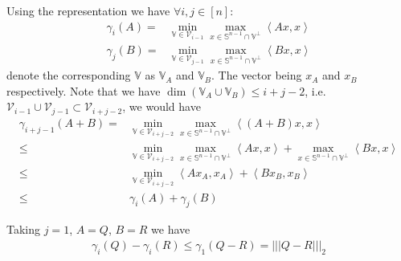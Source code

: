 \documentclass[11pt,a4paper]{ctexart}
\numberwithin{equation}{section}%
\begin{document}
Using the representation we have $ \forall i,j\in[n] $:
\begin{align*}
    \gamma _i(A) = & \mathop{ \min }\limits_{\mathbb{V}\in\mathcal{V}_{i-1}}  \mathop{ \max  }\limits_{x\in \mathbb{S}^{n-1} \cap \mathbb{V}^\perp} \left\langle Ax,x \right\rangle  \\
    \gamma _j(B) = & \mathop{ \min }\limits_{\mathbb{V}\in\mathcal{V}_{j-1}}  \mathop{ \max  }\limits_{x\in \mathbb{S}^{n-1} \cap \mathbb{V}^\perp} \left\langle Bx,x \right\rangle
\end{align*}
denote the corresponding $ \mathbb{V} $ as $ \mathbb{V}_A $ and $ \mathbb{V}_B $. The vector being $ x_A $ and $ x_B $ respectively.
Note that we have $ \dim ( \mathbb{V}_A\cup \mathbb{V}_B)\leq i+j-2 $, i.e. $ \mathcal{V}_{i-1}\cup \mathcal{V}_{j-1}\subset \mathcal{V}_{i+j-2} $, we would have
\begin{align*}
    \gamma _{i+j-1}(A+B) = & \mathop{ \min }\limits_{\mathbb{V}\in\mathcal{V}_{i+j-2}}  \mathop{ \max  }\limits_{x\in \mathbb{S}^{n-1} \cap \mathbb{V}^\perp} \left\langle (A+B)x,x \right\rangle \\
    \leq & \mathop{ \min }\limits_{\mathbb{V}\in\mathcal{V}_{i+j-2}}  \mathop{ \max  }\limits_{x\in \mathbb{S}^{n-1} \cap \mathbb{V}^\perp} \left\langle Ax,x \right\rangle + \mathop{ \max  }\limits_{x\in \mathbb{S}^{n-1} \cap \mathbb{V}^\perp} \left\langle Bx,x \right\rangle \\
    \leq & \mathop{ \min }\limits_{\mathbb{V}\in\mathcal{V}_{i+j-2}}  \left\langle Ax_A,x_A \right\rangle + \left\langle Bx_B,x_B \right\rangle \\
    \leq & \gamma _i(A) + \gamma _j(B)
\end{align*}

Taking $ j=1 $, $ A=Q $, $ B=R $ we have
\begin{align*}
     \gamma _i(Q)-\gamma _i(R) \leq \gamma _1(Q-R) = |||Q-R|||_2
\end{align*}




\end{document}
